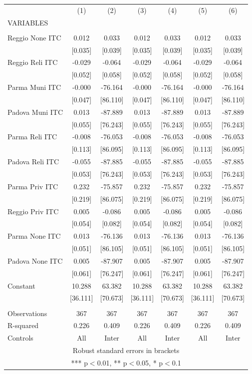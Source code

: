 \begin{tabular}{lcccccc} \hline
 & (1) & (2) & (3) & (4) & (5) & (6) \\
VARIABLES &  &  &  &  &  &  \\ \hline
 &  &  &  &  &  &  \\
Reggio None ITC & 0.012 & 0.033 & 0.012 & 0.033 & 0.012 & 0.033 \\
 & [0.035] & [0.039] & [0.035] & [0.039] & [0.035] & [0.039] \\
Reggio Reli ITC & -0.029 & -0.064 & -0.029 & -0.064 & -0.029 & -0.064 \\
 & [0.052] & [0.058] & [0.052] & [0.058] & [0.052] & [0.058] \\
Parma Muni ITC & -0.000 & -76.164 & -0.000 & -76.164 & -0.000 & -76.164 \\
 & [0.047] & [86.110] & [0.047] & [86.110] & [0.047] & [86.110] \\
Padova Muni ITC & 0.013 & -87.889 & 0.013 & -87.889 & 0.013 & -87.889 \\
 & [0.055] & [76.243] & [0.055] & [76.243] & [0.055] & [76.243] \\
Parma Reli ITC & -0.008 & -76.053 & -0.008 & -76.053 & -0.008 & -76.053 \\
 & [0.113] & [86.095] & [0.113] & [86.095] & [0.113] & [86.095] \\
Padova Reli ITC & -0.055 & -87.885 & -0.055 & -87.885 & -0.055 & -87.885 \\
 & [0.053] & [76.243] & [0.053] & [76.243] & [0.053] & [76.243] \\
Parma Priv ITC & 0.232 & -75.857 & 0.232 & -75.857 & 0.232 & -75.857 \\
 & [0.219] & [86.075] & [0.219] & [86.075] & [0.219] & [86.075] \\
Reggio Priv ITC & 0.005 & -0.086 & 0.005 & -0.086 & 0.005 & -0.086 \\
 & [0.054] & [0.082] & [0.054] & [0.082] & [0.054] & [0.082] \\
Parma None ITC & 0.013 & -76.136 & 0.013 & -76.136 & 0.013 & -76.136 \\
 & [0.051] & [86.105] & [0.051] & [86.105] & [0.051] & [86.105] \\
Padova None ITC & 0.005 & -87.907 & 0.005 & -87.907 & 0.005 & -87.907 \\
 & [0.061] & [76.247] & [0.061] & [76.247] & [0.061] & [76.247] \\
Constant & 10.288 & 63.382 & 10.288 & 63.382 & 10.288 & 63.382 \\
 & [36.111] & [70.673] & [36.111] & [70.673] & [36.111] & [70.673] \\
 &  &  &  &  &  &  \\
Observations & 367 & 367 & 367 & 367 & 367 & 367 \\
R-squared & 0.226 & 0.409 & 0.226 & 0.409 & 0.226 & 0.409 \\
 Controls & All & Inter & All & Inter & All & Inter \\ \hline
\multicolumn{7}{c}{ Robust standard errors in brackets} \\
\multicolumn{7}{c}{ *** p$<$0.01, ** p$<$0.05, * p$<$0.1} \\
\end{tabular}
